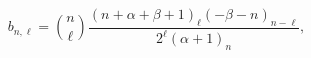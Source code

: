 \[b_{n,\ell}=\binom{n}{\ell}\frac{\left(n+\alpha+\beta+1\right)_{\ell}\left(-%
\beta-n\right)_{n-\ell}}{2^{\ell}\left(\alpha+1\right)_{n}},\]